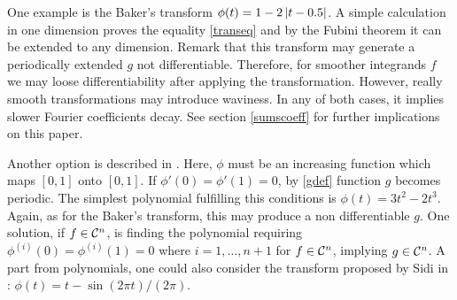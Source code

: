 \documentclass[graybox,footinfo]{svmult}
\begin{document}
One example is the Baker's transform $\phi(t)=1-2\left | t-0.5 \right |$. A simple calculation in one dimension proves the equality \eqref{transeq} and by the Fubini theorem it can be extended to any dimension. Remark that this transform may generate a periodically extended $g$ not differentiable. Therefore, for smoother integrands $f$ we may loose differentiability after applying the transformation. However, really smooth transformations may introduce waviness. In any of both cases, it implies slower Fourier coefficients decay. See section \eqref{sumscoeff} for further implications on this paper.

Another option is described in \cite{SloJoe94}. Here, $\phi$ must be an increasing function which maps $[0,1]$ onto $[0,1]$. If $\phi'(0)=\phi'(1)=0$, by \eqref{gdef} function $g$ becomes periodic. The simplest polynomial fulfilling this conditions is $\phi(t)=3t^2-2t^3$. Again, as for the Baker's transform, this may produce a non differentiable $g$. One solution, if $f\in\mathcal{C}^n$, is finding the polynomial requiring $\phi^{(i)}(0)=\phi^{(i)}(1)=0$  where $i=1,\dots,n+1$ for $f\in\mathcal{C}^n$, implying $g\in\mathcal{C}^n$. A part from polynomials, one could also consider the transform proposed by Sidi in \cite{Sid93}: $\phi(t)=t-\sin(2\pi t)/(2\pi)$.
\end{document}
